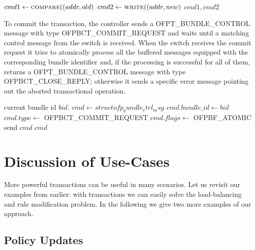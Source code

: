 \documentclass[conference]{sigcomm-alternate}
\newcommand{\cas}{CAS\xspace}
\newcommand{\compare}{compare\xspace}
\newcommand{\memwrite}{write\xspace}
\begin{document}
\begin{algorithm}[t]
    \caption{$\textit{\cas}(addr, old,new)$}
    \label{alg:cas}
    \begin{algorithmic}[1]

    		\State $cmd1\gets \textsc{\compare}((addr, old) $
    		\State $cmd2\gets \textsc{\memwrite}((addr, new) $
			\Return $cmd1,cmd2$
    \end{algorithmic}
\end{algorithm}


To commit the transaction,  the controller sends a \textsf{OFPT\_BUNDLE\_CONTROL} message with type
\textsf{OFPBCT\_COMMIT\_REQUEST} and waits until a matching control
message from the switch is received. When the switch receives the
commit request it tries to atomically process all the buffered messages
equipped with the corresponding bundle identifier and, if the
processing is successful for all of them, returns  a \textsf{OFPT\_BUNDLE\_CONTROL} message with type
\textsf{OFPBCT\_CLOSE\_REPLY}; otherwise it sends a specific error
message  pointing out the aborted transactional operation.

\begin{algorithm}[t]
    \caption{$\textit{try-commit}()$}
    \label{alg:commit}
    \begin{algorithmic}[1]
    \Require  current bundle id $bid$.
		    \State $cmd \gets struct ofp_bundle_ctrl_msg$
    		\State  $cmd.bundle\_id \gets bid$
    		\State  $cmd.type \gets $ \textsf{OFPBCT\_COMMIT\_REQUEST} 
    		\State  $cmd.flags \gets $ \textsf{OFPBF\_ATOMIC}
    		\State send $cmd$
		\Return $cmd$
    \end{algorithmic}
\end{algorithm}

\section{Discussion of Use-Cases}\label{sec:apps}

More powerful transactions can be useful in many scenarios.
Let us revisit our examples from earlier: with
transactions we can easily solve the load-balancing
and rule modification problem.
In the following we give two more examples of our approach.

\subsection{Policy Updates}
\end{document}
